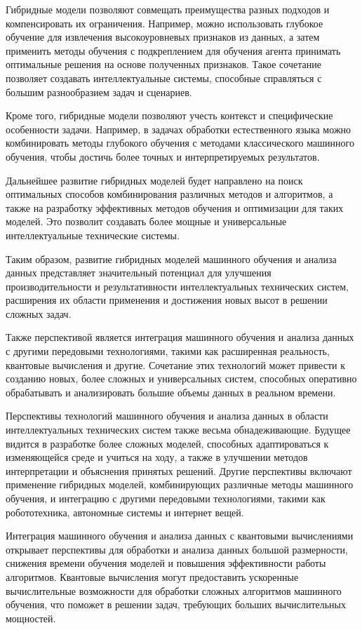     Гибридные модели позволяют совмещать преимущества разных подходов и компенсировать их ограничения. Например, можно использовать глубокое обучение для извлечения высокоуровневых признаков из данных, а затем применить методы обучения с подкреплением для обучения агента принимать оптимальные решения на основе полученных признаков. Такое сочетание позволяет создавать интеллектуальные системы, способные справляться с большим разнообразием задач и сценариев.
    
    Кроме того, гибридные модели позволяют учесть контекст и специфические особенности задачи. Например, в задачах обработки естественного языка можно комбинировать методы глубокого обучения с методами классического машинного обучения, чтобы достичь более точных и интерпретируемых результатов.
    
    Дальнейшее развитие гибридных моделей будет направлено на поиск оптимальных способов комбинирования различных методов и алгоритмов, а также на разработку эффективных методов обучения и оптимизации для таких моделей. Это позволит создавать более мощные и универсальные интеллектуальные технические системы.
    
    Таким образом, развитие гибридных моделей машинного обучения и анализа данных представляет значительный потенциал для улучшения производительности и результативности интеллектуальных технических систем, расширения их области применения и достижения новых высот в решении сложных задач.
    
    Также перспективой является интеграция машинного обучения и анализа данных с другими передовыми технологиями, такими как расширенная реальность, квантовые вычисления и другие. Сочетание этих технологий может привести к созданию новых, более сложных и универсальных систем, способных оперативно обрабатывать и анализировать большие объемы данных в реальном времени.
    
    Перспективы технологий машинного обучения и анализа данных в области интеллектуальных технических систем также весьма обнадеживающие. Будущее видится в разработке более сложных моделей, способных адаптироваться к изменяющейся среде и учиться на ходу, а также в улучшении методов интерпретации и объяснения принятых решений. Другие перспективы включают применение гибридных моделей, комбинирующих различные методы машинного обучения, и интеграцию с другими передовыми технологиями, такими как робототехника, автономные системы и интернет вещей.
    
    Интеграция машинного обучения и анализа данных с квантовыми вычислениями открывает перспективы для обработки и анализа данных большой размерности, снижения времени обучения моделей и повышения эффективности работы алгоритмов. Квантовые вычисления могут предоставить ускоренные вычислительные возможности для обработки сложных алгоритмов машинного обучения, что поможет в решении задач, требующих больших вычислительных мощностей.
    

